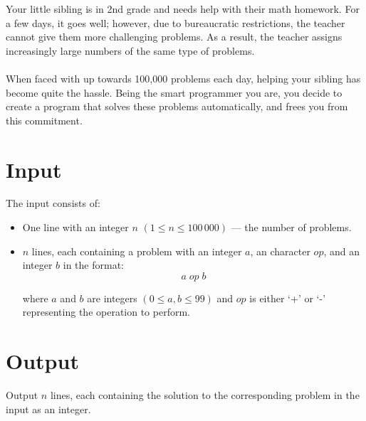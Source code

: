 Your little sibling is in 2nd grade and needs help with their math homework. 
For a few days, it goes well; however, due to bureaucratic restrictions, the teacher cannot give them more challenging problems.
As a result, the teacher assigns increasingly large numbers of the same type of problems.
\\
\\
When faced with up towards 100,000 problems each day, helping your sibling has become quite the hassle.
Being the smart programmer you are, you decide to create a program that solves these problems automatically, and frees you from this commitment.



\section*{Input}
The input consists of:
    \begin{itemize}
        \item One line with an integer $n$ $(1 \le n \le 100\,000)$ — the number of problems.
        \item $n$ lines, each containing a problem with an integer $a$, an character $op$, and an integer $b$ in the format:
            \[
            a \; op \; b
            \]
            
            where $a$ and $b$ are integers $(0 \le a,b \le 99)$ and $op$ is either `+' or `-' representing the operation to perform.
    \end{itemize}

\section*{Output}
Output $n$ lines, each containing the solution to the corresponding problem in the input as an integer.